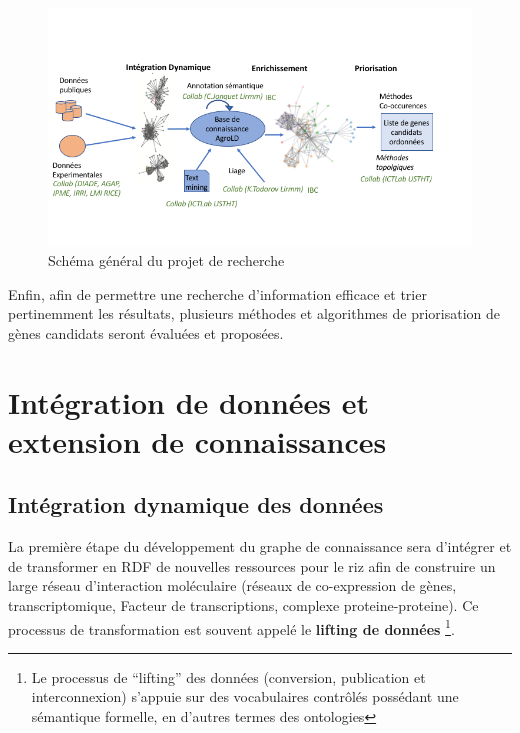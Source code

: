 \begin{figure}[!ht]
\begin{center}
	\includegraphics[width=1\textwidth]{Figures/schema-projet-recherche.png}
\end{center}
\label{schema-general}
\caption{ Schéma général du projet de recherche}
\end{figure}

Enfin, afin de permettre une recherche d’information efficace et trier pertinemment les résultats, plusieurs méthodes et algorithmes de priorisation de gènes candidats seront évaluées et proposées. \\




\section{Intégration de données et extension de connaissances}




\subsection{Intégration dynamique des données}

La première étape du développement du graphe de connaissance sera d’intégrer et de transformer en RDF de nouvelles ressources pour le riz afin de construire un large réseau d’interaction moléculaire (réseaux de co-expression de gènes, transcriptomique, Facteur de transcriptions, complexe proteine-proteine). Ce processus de transformation est souvent appelé le \textbf{lifting de données} \footnote{Le processus de “lifting” des données (conversion, publication et interconnexion) s’appuie sur des vocabulaires contrôlés possédant une sémantique formelle, en d’autres termes des ontologies}.

